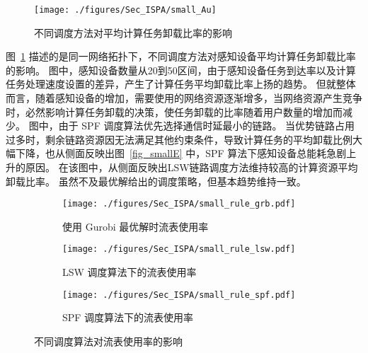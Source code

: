 \begin{figure}[!b]
  \centering
  \texttt{[image: ./figures/Sec\_ISPA/small\_Au]}
  \caption{不同调度方法对平均计算任务卸载比率的影响}
  \label{fig_smallAu}
\end{figure}
\vspace{-0.5em}

图~\ref{fig_smallAu} 描述的是同一网络拓扑下，不同调度方法对感知设备平均计算任务卸载比率的影响。
图中，感知设备数量从20到50区间，由于感知设备任务到达率以及计算任务处理速度设置的差异，产生了计算任务平均卸载比率上扬的趋势。
但就整体而言，随着感知设备的增加，需要使用的网络资源逐渐增多，当网络资源产生竞争时，必然影响计算任务卸载的决策，使任务卸载的比率随着用户数量的增加而减少。
图中，由于 SPF 调度算法优先选择通信时延最小的链路。
当优势链路占用过多时，剩余链路资源因无法满足其他约束条件，导致计算任务的平均卸载比例大幅下降，也从侧面反映出图~\ref{fig_smallE} 中，SPF 算法下感知设备总能耗急剧上升的原因。
在该图中，从侧面反映出LSW链路调度方法维持较高的计算资源平均卸载比率。
虽然不及最优解给出的调度策略，但基本趋势维持一致。

\begin{figure}[!h]
  \centering
  \begin{subfigure}[h]{0.99\linewidth}
    \centering
    \texttt{[image: ./figures/Sec\_ISPA/small\_rule\_grb.pdf]}
    \label{fig_smallNetworkRG}
    \vspace{-0.5em}
    \caption{使用 Gurobi 最优解时流表使用率}
  \end{subfigure}
  \begin{subfigure}[h]{0.99\linewidth}
    \centering
    \texttt{[image: ./figures/Sec\_ISPA/small\_rule\_lsw.pdf]}
    \label{fig_smallNetworkRL}
    \vspace{-0.5em}
    \caption{LSW 调度算法下的流表使用率}
  \end{subfigure}
  \begin{subfigure}[h]{0.99\linewidth}
    \centering
    \texttt{[image: ./figures/Sec\_ISPA/small\_rule\_spf.pdf]}
    \label{fig_smallNetworkRS}
    \vspace{-0.5em}
    \caption{SPF 调度算法下的流表使用率}
  \end{subfigure}
  \vspace{-0.5em}
  \caption{不同调度算法对流表使用率的影响}
\label{fig_smallrule}
\end{figure}

